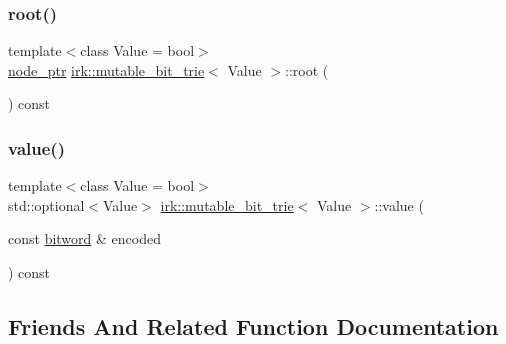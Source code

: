 \subsubsection{\texorpdfstring{root()}{root()}}
{\footnotesize\ttfamily template$<$class Value = bool$>$ \\
\mbox{\hyperlink{classirk_1_1mutable__bit__trie_abd23179ac4f02a981d4f47b4c0652287}{node\+\_\+ptr}} \mbox{\hyperlink{classirk_1_1mutable__bit__trie}{irk\+::mutable\+\_\+bit\+\_\+trie}}$<$ Value $>$\+::root (\begin{DoxyParamCaption}{ }\end{DoxyParamCaption}) const\hspace{0.3cm}{\ttfamily [inline]}}

\mbox{\label{classirk_1_1mutable__bit__trie_ad0bb2e18842b722d7deb1a5d4b72b890}} 
\subsubsection{\texorpdfstring{value()}{value()}}
{\footnotesize\ttfamily template$<$class Value = bool$>$ \\
std\+::optional$<$Value$>$ \mbox{\hyperlink{classirk_1_1mutable__bit__trie}{irk\+::mutable\+\_\+bit\+\_\+trie}}$<$ Value $>$\+::value (\begin{DoxyParamCaption}\item[{const \mbox{\hyperlink{namespaceirk_a5d1a67079cf6423ecaededebe848f083}{bitword}} \&}]{encoded }\end{DoxyParamCaption}) const\hspace{0.3cm}{\ttfamily [inline]}}



\subsection{Friends And Related Function Documentation}
\mbox{\label{classirk_1_1mutable__bit__trie_a91e672d5695fe80b17bbfd474d593ec2}} 

